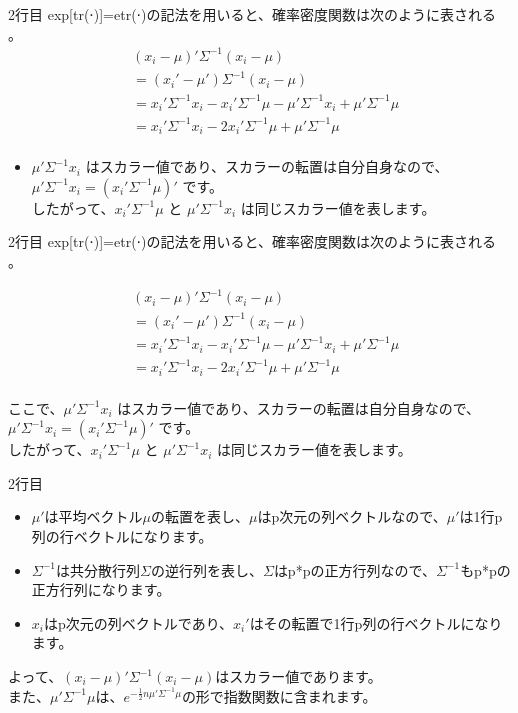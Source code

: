 \documentclass[aspectratio=169]{beamer}
\begin{document}
\begin{CJK}{UTF8}{min}
\begin{frame}{2行目}
exp[tr(⋅)]=etr(⋅)の記法を用いると、確率密度関数は次のように表される 。
\begin{align*}
&(x_i - \mu)'\Sigma^{-1}(x_i - \mu) \\
&= (x_i' - \mu')\Sigma^{-1}(x_i - \mu) \\
&= x_i'\Sigma^{-1}x_i - x_i'\Sigma^{-1}\mu - \mu'\Sigma^{-1}x_i + \mu'\Sigma^{-1}\mu \\
&= x_i'\Sigma^{-1}x_i - 2x_i'\Sigma^{-1}\mu + \mu'\Sigma^{-1}\mu \\
\end{align*}
\begin{itemize}
\item {}\(\mu'\Sigma^{-1}x_i\) はスカラー値であり、スカラーの転置は自分自身なので、\(\mu'\Sigma^{-1}x_i = (x_i'\Sigma^{-1}\mu)'\) です。\\
したがって、\(x_i'\Sigma^{-1}\mu\) と \(\mu'\Sigma^{-1}x_i\) は同じスカラー値を表します。
\end{itemize}
\end{frame}\begin{frame}{2行目}
exp[tr(⋅)]=etr(⋅)の記法を用いると、確率密度関数は次のように表される 。

\begin{align*}
&(x_i - \mu)'\Sigma^{-1}(x_i - \mu) \\
&= (x_i' - \mu')\Sigma^{-1}(x_i - \mu) \\
&= x_i'\Sigma^{-1}x_i - x_i'\Sigma^{-1}\mu - \mu'\Sigma^{-1}x_i + \mu'\Sigma^{-1}\mu \\
&= x_i'\Sigma^{-1}x_i - 2x_i'\Sigma^{-1}\mu + \mu'\Sigma^{-1}\mu \\
\end{align*}

ここで、$\mu'\Sigma^{-1}x_i$ はスカラー値であり、スカラーの転置は自分自身なので、$\mu'\Sigma^{-1}x_i = (x_i'\Sigma^{-1}\mu)'$ です。\\
したがって、$x_i'\Sigma^{-1}\mu$ と $\mu'\Sigma^{-1}x_i$ は同じスカラー値を表します。

\end{frame}

\begin{frame}{2行目}
\begin{itemize}
    \item $\mu'$は平均ベクトル$\mu$の転置を表し、$\mu$はp次元の列ベクトルなので、$\mu'$は1行p列の行ベクトルになります。
    \item $\Sigma^{-1}$は共分散行列$\Sigma$の逆行列を表し、$\Sigma$はp*pの正方行列なので、$\Sigma^{-1}$もp*pの正方行列になります。
    \item $x_i$はp次元の列ベクトルであり、$x_i'$はその転置で1行p列の行ベクトルになります。
\end{itemize}
よって、$(x_i - \mu)' \Sigma^{-1} (x_i - \mu)$はスカラー値であります。\\
また、$\mu'\Sigma^{-1}\mu\text{は、}e^{-\frac{1}{2}n\mu'\Sigma^{-1}\mu}$の形で指数関数に含まれます。
\end{frame}


\end{CJK}
\end{document}
